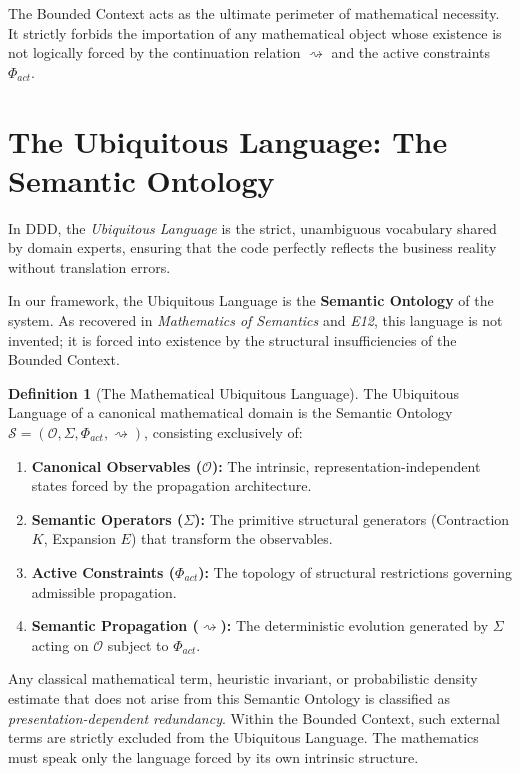 \documentclass[12pt,openany]{extbook}
\theoremstyle{plain}
\theoremstyle{definition}
\newtheorem{definition}{Definition}[chapter]
\begin{document}
The Bounded Context acts as the ultimate perimeter of mathematical necessity. It strictly forbids the importation of any mathematical object whose existence is not logically forced by the continuation relation $\rightsquigarrow$ and the active constraints $\Phi_{act}$.

\section{The Ubiquitous Language: The Semantic Ontology}

In DDD, the \emph{Ubiquitous Language} is the strict, unambiguous vocabulary shared by domain experts, ensuring that the code perfectly reflects the business reality without translation errors.

In our framework, the Ubiquitous Language is the \textbf{Semantic Ontology} of the system. As recovered in \emph{Mathematics of Semantics} and \emph{E12}, this language is not invented; it is forced into existence by the structural insufficiencies of the Bounded Context. 

\begin{definition}[The Mathematical Ubiquitous Language]
The Ubiquitous Language of a canonical mathematical domain is the Semantic Ontology $\mathcal{S} = (\mathcal{O}, \Sigma, \Phi_{act}, \rightsquigarrow)$, consisting exclusively of:
\begin{enumerate}
    \item \textbf{Canonical Observables ($\mathcal{O}$):} The intrinsic, representation-independent states forced by the propagation architecture.
    \item \textbf{Semantic Operators ($\Sigma$):} The primitive structural generators (Contraction $K$, Expansion $E$) that transform the observables.
    \item \textbf{Active Constraints ($\Phi_{act}$):} The topology of structural restrictions governing admissible propagation.
    \item \textbf{Semantic Propagation ($\rightsquigarrow$):} The deterministic evolution generated by $\Sigma$ acting on $\mathcal{O}$ subject to $\Phi_{act}$.
\end{enumerate}
\end{definition}

Any classical mathematical term, heuristic invariant, or probabilistic density estimate that does not arise from this Semantic Ontology is classified as \emph{presentation-dependent redundancy}. Within the Bounded Context, such external terms are strictly excluded from the Ubiquitous Language. The mathematics must speak only the language forced by its own intrinsic structure.
\end{document}
